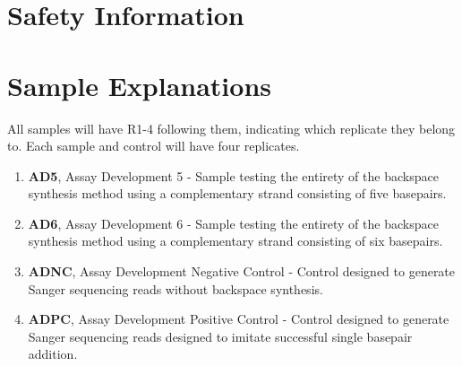 \documentclass{ssiBio}
\begin{document}
\section{Safety Information}
\begin{safety}
  \begin{enumerate}
    \SYBRGOLD
  \end{enumerate}
\end{safety}

\section{Sample Explanations}
All samples will have R1-4 following them, indicating which replicate they belong to. Each sample and control will have four replicates.
\begin{enumerate}
  \item{\textbf{AD5}, Assay Development 5 - Sample testing the entirety of the backspace synthesis method using a complementary strand consisting of five basepairs.}
  \item{\textbf{AD6}, Assay Development 6 - Sample testing the entirety of the backspace synthesis method using a complementary strand consisting of six basepairs.}
  \item{\textbf{ADNC}, Assay Development Negative Control - Control designed to generate Sanger sequencing reads without backspace synthesis.}
  \item{\textbf{ADPC}, Assay Development Positive Control - Control designed to generate Sanger sequencing reads designed to imitate successful single basepair addition.}
\end{enumerate}
\end{document}
